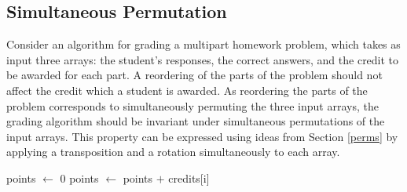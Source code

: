 \documentclass{llncs}
\DeclareMathOperator{\len}{length}
\begin{document}
\subsection{Simultaneous Permutation}

Consider an algorithm for grading a multipart homework problem, which takes as input three arrays:  the student's responses, the correct answers, and the credit to be awarded for each part.  A reordering of the parts of the problem should not affect the credit which a student is awarded.  As reordering the parts of the problem corresponds to simultaneously permuting the three input arrays, the grading algorithm should be invariant under simultaneous permutations of the input arrays.  This property can be expressed using ideas from Section \ref{perms} by applying a transposition and a rotation simultaneously to each array.%
%


\begin{algorithm}
\begin{algorithmic}
\State points \(\gets\) 0
\State points \(\gets\) points \(+\) credits[i]
\EndIf
\EndFor
{}
\EndFunction
\end{algorithmic}
\end{algorithm}
\end{document}
